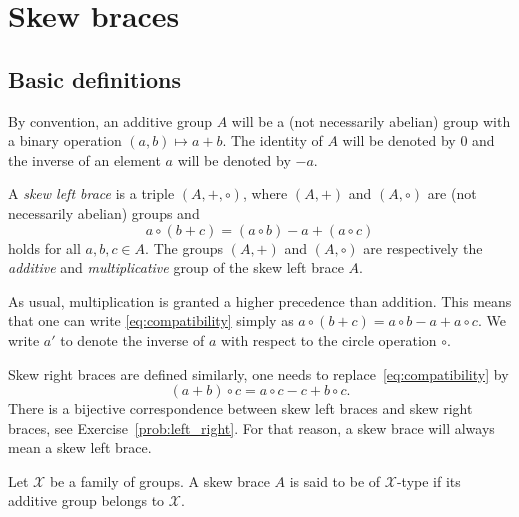 \chapter{Skew braces}
\label{braces}

\section{Basic definitions}

By convention, an additive group $A$ will be a (not necessarily abelian) group 
with a binary operation $(a,b)\mapsto a+b$. The 
identity of $A$ will be denoted by $0$ and the inverse of an element $a$ will be denoted by $-a$. 

\begin{definition}
    \label{def:brace}
	A \emph{skew left brace} is a triple $(A,+,\circ)$, where $(A,+)$ and $(A,\circ)$ 
	are (not necessarily abelian) 
	groups and 
	\begin{equation}
	    \label{eq:compatibility}
	    a\circ(b+c)=(a\circ b)-a+(a\circ c)
	\end{equation}
	holds for all $a,b,c\in A$. The groups 
	$(A,+)$ and $(A,\circ)$ are respectively 
	the \emph{additive} and \emph{multiplicative} group
	of the skew left brace $A$.
\end{definition}

As usual, multiplication is granted a higher precedence than addition. This means that one can write
\eqref{eq:compatibility} simply as 
$a\circ(b+c)=a\circ b-a+a\circ c$. 
We write $a'$ to denote the inverse of $a$ with respect to the circle operation $\circ$. 

Skew right braces are defined similarly, one needs 
to replace~\eqref{eq:compatibility} by 
\[
(a+b)\circ c=a\circ c-c+b\circ c.
\]
There is a bijective correspondence between skew left braces and skew right braces, 
see Exercise~\ref{prob:left_right}. For that reason, 
a skew brace will always mean a skew left brace. 

\begin{definition}
    Let $\mathcal{X}$ be a family of groups. A skew brace $A$ is said to be
    of $\mathcal{X}$-type if its additive group belongs to $\mathcal{X}$.
\end{definition}

